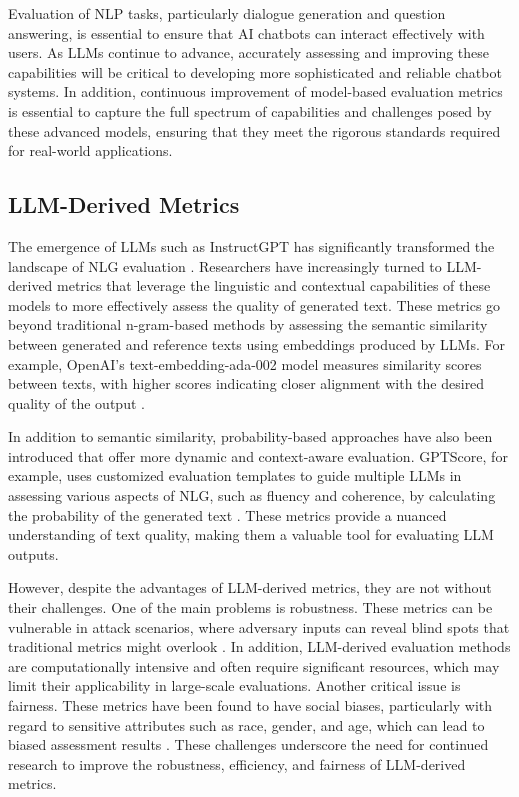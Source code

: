 Evaluation of NLP tasks, particularly dialogue generation and question answering, is essential to ensure that AI chatbots can interact effectively with users. As LLMs continue to advance, accurately assessing and improving these capabilities will be critical to developing more sophisticated and reliable chatbot systems. In addition, continuous improvement of model-based evaluation metrics is essential to capture the full spectrum of capabilities and challenges posed by these advanced models, ensuring that they meet the rigorous standards required for real-world applications.

\subsection{LLM-Derived Metrics}

The emergence of LLMs such as InstructGPT has significantly transformed the landscape of NLG evaluation \cite{ouyang2022training}. Researchers have increasingly turned to LLM-derived metrics that leverage the linguistic and contextual capabilities of these models to more effectively assess the quality of generated text. These metrics go beyond traditional n-gram-based methods by assessing the semantic similarity between generated and reference texts using embeddings produced by LLMs. For example, OpenAI's text-embedding-ada-002 model measures similarity scores between texts, with higher scores indicating closer alignment with the desired quality of the output \cite{es2023ragas}.

In addition to semantic similarity, probability-based approaches have also been introduced that offer more dynamic and context-aware evaluation. GPTScore, for example, uses customized evaluation templates to guide multiple LLMs in assessing various aspects of NLG, such as fluency and coherence, by calculating the probability of the generated text \cite{fu2023gptscore}. These metrics provide a nuanced understanding of text quality, making them a valuable tool for evaluating LLM outputs.

However, despite the advantages of LLM-derived metrics, they are not without their challenges. One of the main problems is robustness. These metrics can be vulnerable in attack scenarios, where adversary inputs can reveal blind spots that traditional metrics might overlook \cite{he2022blind}. In addition, LLM-derived evaluation methods are computationally intensive and often require significant resources, which may limit their applicability in large-scale evaluations. Another critical issue is fairness. These metrics have been found to have social biases, particularly with regard to sensitive attributes such as race, gender, and age, which can lead to biased assessment results \cite{sun2022bertscore}. These challenges underscore the need for continued research to improve the robustness, efficiency, and fairness of LLM-derived metrics.


